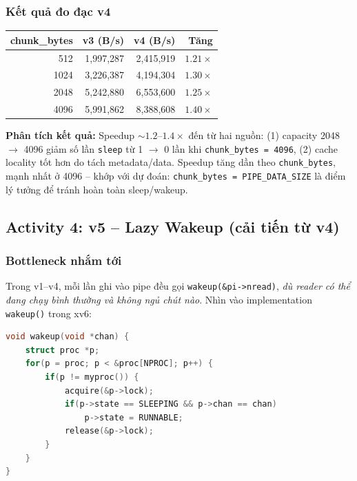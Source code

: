 \documentclass[11pt,a4paper]{article}
\begin{document}
\subsubsection{Kết quả đo đạc v4}

\begin{center}
\begin{tabular}{rrrr}
\toprule
\textbf{chunk\_bytes} & \textbf{v3 (B/s)} & \textbf{v4 (B/s)} & \textbf{Tăng} \\
\midrule
512  & 1{,}997{,}287 & 2{,}415{,}919 & $1.21\times$ \\
1024 & 3{,}226{,}387 & 4{,}194{,}304 & $1.30\times$ \\
2048 & 5{,}242{,}880 & 6{,}553{,}600 & $1.25\times$ \\
4096 & 5{,}991{,}862 & 8{,}388{,}608 & $1.40\times$ \\
\bottomrule
\end{tabular}
\end{center}

\textbf{Phân tích kết quả:} Speedup $\sim 1.2$--$1.4\times$ đến từ hai nguồn: (1) capacity 2048 $\rightarrow$ 4096 giảm số lần \texttt{sleep} từ 1 $\rightarrow$ 0 lần khi \texttt{chunk\_bytes = 4096}, (2) cache locality tốt hơn do tách metadata/data. Speedup tăng dần theo \texttt{chunk\_bytes}, mạnh nhất ở 4096 -- khớp với dự đoán: \texttt{chunk\_bytes = PIPE\_DATA\_SIZE} là điểm lý tưởng để tránh hoàn toàn sleep/wakeup.

\subsection{Activity 4: v5 -- Lazy Wakeup (cải tiến từ v4)}

\subsubsection{Bottleneck nhắm tới}

Trong v1--v4, mỗi lần ghi vào pipe đều gọi \texttt{wakeup(\&pi->nread)}, \emph{dù reader có thể đang chạy bình thường và không ngủ chút nào}. Nhìn vào implementation \texttt{wakeup()} trong xv6:

\begin{lstlisting}[language=C]
void wakeup(void *chan) {
    struct proc *p;
    for(p = proc; p < &proc[NPROC]; p++) {
        if(p != myproc()) {
            acquire(&p->lock);
            if(p->state == SLEEPING && p->chan == chan)
                p->state = RUNNABLE;
            release(&p->lock);
        }
    }
}
\end{lstlisting}
\end{document}

